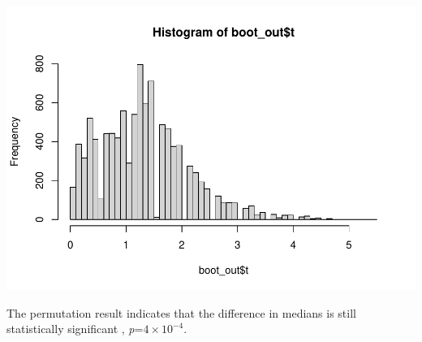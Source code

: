 \documentclass[
]{article}
\newenvironment{Shaded}{\begin{snugshade}}{\end{snugshade}}
\newcommand{\DecValTok}[1]{\textcolor[rgb]{0.00,0.00,0.81}{#1}}
\newcommand{\FloatTok}[1]{\textcolor[rgb]{0.00,0.00,0.81}{#1}}
\newcommand{\FunctionTok}[1]{\textcolor[rgb]{0.00,0.00,0.00}{#1}}
\newcommand{\NormalTok}[1]{#1}
\newcommand{\OtherTok}[1]{\textcolor[rgb]{0.56,0.35,0.01}{#1}}
\newcommand{\SpecialCharTok}[1]{\textcolor[rgb]{0.00,0.00,0.00}{#1}}
\begin{document}
\includegraphics{Homework_07_new_Pan_files/figure-latex/unnamed-chunk-7-1.pdf}

\begin{Shaded}
\end{Shaded}

The permutation result indicates that the difference in medians is still
statistically significant , \emph{p}=\ensuremath{4\times 10^{-4}}.
\end{document}
